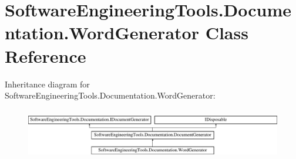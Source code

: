 \hypertarget{class_software_engineering_tools_1_1_documentation_1_1_word_generator}{\section{Software\+Engineering\+Tools.\+Documentation.\+Word\+Generator Class Reference}
\label{class_software_engineering_tools_1_1_documentation_1_1_word_generator}
}
Inheritance diagram for Software\+Engineering\+Tools.\+Documentation.\+Word\+Generator\+:\begin{figure}[H]
\begin{center}
\leavevmode
\includegraphics[height=2.240000cm]{class_software_engineering_tools_1_1_documentation_1_1_word_generator}
\end{center}
\end{figure}
